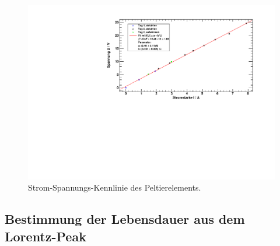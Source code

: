 \begin{figure}[H]
\begin{center}
  \includegraphics[width=\textwidth]{../img/graph_U-I.pdf}
  \caption{Strom-Spannungs-Kennlinie des Peltierelements.}
  \label{img:UI}
\end{center}
\end{figure}




\subsection{Bestimmung der Lebensdauer aus dem Lorentz-Peak}
